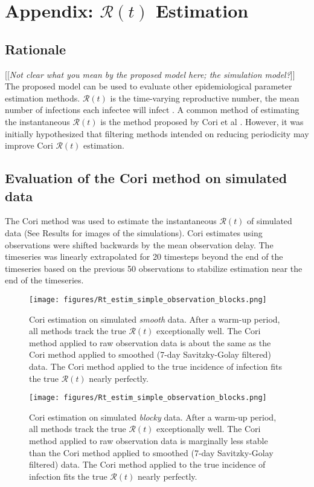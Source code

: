 \documentclass{article}
\newcommand{\nR}{\mathcal{R}}
\newcommand{\jd}[1]{[[\textsl{#1}]]}
\begin{document}
{\section{Appendix: $\nR(t)$ Estimation}
\subsection{Rationale}
\jd{Not clear what you mean by the proposed model here; the simulation model?}
The proposed model can be used to evaluate other epidemiological parameter estimation methods. $\nR(t)$ is the time-varying reproductive number, the mean number of infections each infectee will infect \cite{Gostic}. A common method of estimating the instantaneous $\nR(t)$ is the method proposed by Cori et al \cite{Cori}. However, it was initially hypothesized that filtering methods intended on reducing periodicity may improve Cori $\nR(t)$ estimation. 


\subsection{Evaluation of the Cori method on simulated data}
The Cori method was used to estimate the instantaneous $\nR(t)$ of simulated data (See Results for images of the simulations). Cori estimates using observations were shifted backwards by the mean observation delay. The timeseries was linearly extrapolated for 20 timesteps beyond the end of the timeseries based on the previous 50 observations to stabilize estimation near the end of the timeseries.

\begin{figure}[h!]
\centering
\texttt{[image: figures/Rt\_estim\_simple\_observation\_blocks.png]}
\caption{Cori estimation on simulated \emph{smooth} data. After a warm-up period, all methods track the true $\nR(t)$ exceptionally well. The Cori method applied to raw observation data is about the same as the Cori method applied to smoothed (7-day Savitzky-Golay filtered) data. The Cori method applied to the true incidence of infection fits the true $\nR(t)$ nearly perfectly.}
\end{figure}

\clearpage

\begin{figure}[h!]
\centering
\texttt{[image: figures/Rt\_estim\_simple\_observation\_blocks.png]}
\caption{Cori estimation on simulated \emph{blocky} data. After a warm-up period, all methods track the true $\nR(t)$ exceptionally well. The Cori method applied to raw observation data is marginally less stable than the Cori method applied to smoothed (7-day Savitzky-Golay filtered) data. The Cori method applied to the true incidence of infection fits the true $\nR(t)$ nearly perfectly.} 
\end{figure}

}
\end{document}

